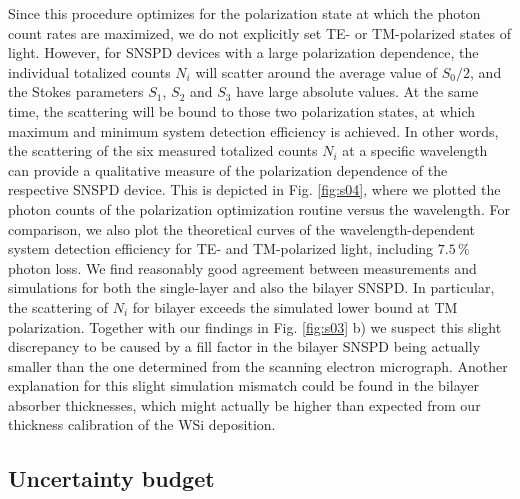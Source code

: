 \documentclass[aip,apl,showpacs,showkeys,preprint,superscriptaddress,preprintnumbers,amsmath,amssymb]{revtex4-1}
\begin{document}
\begin{bibunit}
Since this procedure optimizes for the polarization state at which the photon count rates are maximized, we do not explicitly set TE- or TM-polarized states of light. However, for SNSPD devices with a large polarization dependence, the individual totalized counts $N_i$ will scatter around the average value of $S_0/2$, and the Stokes parameters $S_1$, $S_2$ and $S_3$ have large absolute values. At the same time, the scattering will be bound to those two polarization states, at which maximum and minimum system detection efficiency is achieved. In other words, the scattering of the six measured totalized counts $N_i$ at a specific wavelength can provide a qualitative measure of the polarization dependence of the respective SNSPD device. This is depicted in Fig. \ref{fig:s04}, where we plotted the photon counts of the polarization optimization routine versus the wavelength. For comparison, we also plot the theoretical curves of the wavelength-dependent system detection efficiency for TE- and TM-polarized light, including $7.5\,\%$ photon loss. We find reasonably good agreement between measurements and simulations for both the single-layer and also the bilayer SNSPD. In particular, the scattering of $N_i$ for bilayer exceeds the simulated lower bound at TM polarization. Together with our findings in Fig. \ref{fig:s03} b) we suspect this slight discrepancy to be caused by a fill factor in the bilayer SNSPD being actually smaller than the one determined from the scanning electron micrograph. Another explanation for this slight simulation mismatch could be found in the bilayer absorber thicknesses, which might actually be higher than expected from our thickness calibration of the WSi deposition.


\subsection{Uncertainty budget}


\end{bibunit}
\end{document}
